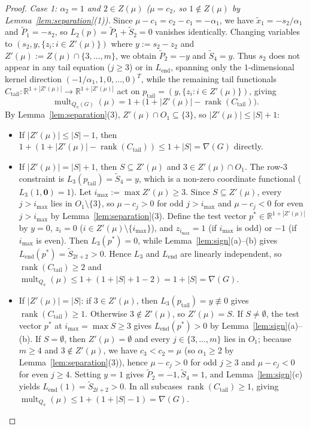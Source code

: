 \documentclass[11pt,a4paper]{article}
\theoremstyle{definition}
\DeclareMathOperator{\mult}{mult}
\DeclareMathOperator{\rank}{rank}
\begin{document}
\begin{proof}
  \emph{Case 1: $\alpha_2 = 1$ and $2 \in Z(\mu)$ ($\mu = c_2$, so $1 \notin Z(\mu)$ by Lemma~\ref{lem:separation}(1)).}
  Since $\mu - c_1 = c_2 - c_1 = -\alpha_1$, we have $\tilde{x}_1 = -s_2/\alpha_1$ and $\tilde{P}_1 = -s_2$, so $L_2(p) = \tilde{P}_1 + \tilde{S}_2 = 0$ vanishes identically. Changing variables to $(s_2, y, \{z_i : i \in Z'(\mu)\})$ where $y := s_2 - z_2$ and $Z'(\mu) := Z(\mu) \cap \{3,\dots,m\}$, we obtain $\tilde{P}_2 = -y$ and $\tilde{S}_4 = y$. Thus $s_2$ does not appear in any tail equation ($j \ge 3$) or in $L_{\mathrm{end}}$, spanning only the $1$-dimensional kernel direction $(-1/\alpha_1, 1, 0,\dots,0)^T$, while the remaining tail functionals $C_{\mathrm{tail}} : \mathbb{R}^{1 + |Z'(\mu)|} \to \mathbb{R}^{1 + |Z'(\mu)|}$ act on $p_{\mathrm{tail}} = (y, \{z_i : i \in Z'(\mu)\})$, giving
  \[
    \mult_{Q_\pi(G)}(\mu) = 1 + \bigl(1 + |Z'(\mu)| - \rank(C_{\mathrm{tail}})\bigr).
  \]
  By Lemma~\ref{lem:separation}(3), $Z'(\mu) \cap O_1 \subseteq \{3\}$, so $|Z'(\mu)| \le |S| + 1$:
  \begin{itemize}
    \item If $|Z'(\mu)| \le |S| - 1$, then $1 + (1 + |Z'(\mu)| - \rank(C_{\mathrm{tail}})) \le 1 + |S| = \nabla(G)$ directly.
    \item If $|Z'(\mu)| = |S| + 1$, then $S \subseteq Z'(\mu)$ and $3 \in Z'(\mu) \cap O_1$. The row-$3$ constraint is $L_3(p_{\mathrm{tail}}) = \tilde{S}_4 = y$, which is a non-zero coordinate functional ($L_3(1, \mathbf{0}) = 1$). Let $i_{\max} := \max Z'(\mu) \ge 3$. Since $S \subseteq Z'(\mu)$, every $j > i_{\max}$ lies in $O_1 \setminus \{3\}$, so $\mu - c_j > 0$ for odd $j > i_{\max}$ and $\mu - c_j < 0$ for even $j > i_{\max}$ by Lemma~\ref{lem:separation}(3). Define the test vector $p^* \in \mathbb{R}^{1+|Z'(\mu)|}$ by $y = 0$, $z_i = 0$ ($i \in Z'(\mu) \setminus \{i_{\max}\}$), and $z_{i_{\max}} = 1$ (if $i_{\max}$ is odd) or $-1$ (if $i_{\max}$ is even). Then $L_3(p^*) = 0$, while Lemma~\ref{lem:sign}(a)--(b) gives $L_{\mathrm{end}}(p^*) = \tilde{S}_{2t+2} > 0$. Hence $L_3$ and $L_{\mathrm{end}}$ are linearly independent, so $\rank(C_{\mathrm{tail}}) \ge 2$ and $\mult_{Q_\pi}(\mu) \le 1 + (1 + |S| + 1 - 2) = 1 + |S| = \nabla(G)$.
    \item If $|Z'(\mu)| = |S|$: if $3 \in Z'(\mu)$, then $L_3(p_{\mathrm{tail}}) = y \not\equiv 0$ gives $\rank(C_{\mathrm{tail}}) \ge 1$. Otherwise $3 \notin Z'(\mu)$, so $Z'(\mu) = S$. If $S \ne \emptyset$, the test vector $p^*$ at $i_{\max} = \max S \ge 3$ gives $L_{\mathrm{end}}(p^*) > 0$ by Lemma~\ref{lem:sign}(a)--(b). If $S = \emptyset$, then $Z'(\mu) = \emptyset$ and every $j \in \{3,\dots,m\}$ lies in $O_1$; because $m \ge 4$ and $3 \notin Z'(\mu)$, we have $c_3 < c_2 = \mu$ (so $\alpha_1 \ge 2$ by Lemma~\ref{lem:separation}(3)), hence $\mu - c_j > 0$ for odd $j \ge 3$ and $\mu - c_j < 0$ for even $j \ge 4$. Setting $y = 1$ gives $\tilde{P}_2 = -1, \tilde{S}_4 = 1$, and Lemma~\ref{lem:sign}(c) yields $L_{\mathrm{end}}(1) = \tilde{S}_{2t+2} > 0$. In all subcases $\rank(C_{\mathrm{tail}}) \ge 1$, giving $\mult_{Q_\pi}(\mu) \le 1 + (1 + |S| - 1) = \nabla(G)$.
  \end{itemize}


\end{proof}
\end{document}
